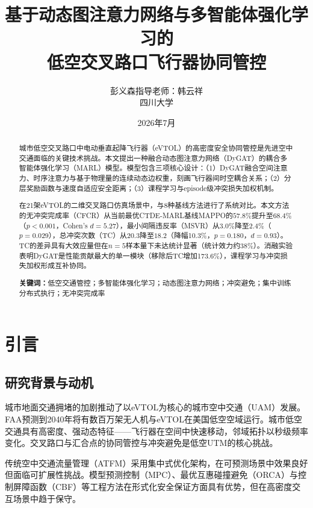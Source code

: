 \documentclass[12pt,a4paper,UTF8]{ctexart}
\title{\textbf{基于动态图注意力网络与多智能体强化学习的\\低空交叉路口飞行器协同管控}}
\author{彭义森\quad 指导老师：韩云祥\\[4pt]\small 四川大学}
\date{2026年7月}
\begin{document}
\maketitle

\begin{abstract}
城市低空交叉路口中电动垂直起降飞行器（eVTOL）的高密度安全协同管控是先进空中交通面临的关键技术挑战。本文提出一种融合动态图注意力网络（DyGAT）的耦合多智能体强化学习（MARL）模型。模型包含三项核心设计：（1）DyGAT融合空间注意力、时序注意力与基于物理量的连续动态边权重，刻画飞行器间时空耦合关系；（2）分层奖励函数与速度自适应安全距离；（3）课程学习与episode级冲突损失加权机制。

在21架eVTOL的二维交叉路口仿真场景中，与8种基线方法进行了系统对比。本文方法的无冲突完成率（CFCR）从当前最优CTDE-MARL基线MAPPO的$57.8\%$提升至$68.4\%$（$p<0.001$，Cohen's $d=5.27$），最小间隔违反率（MSVR）从$3.0\%$降至$2.4\%$（$p=0.029$），总冲突次数（TC）从$20.3$降至$18.2$（降幅10.3\%，$p=0.180$，$d=0.93$）。TC的差异具有大效应量但在$n=5$样本量下未达统计显著（统计效力约38\%）。消融实验表明DyGAT是性能贡献最大的单一模块（移除后TC增加173.6\%），课程学习与冲突损失加权形成互补协同。

\noindent\textbf{关键词：}低空交通管控；多智能体强化学习；动态图注意力网络；冲突避免；集中训练分布式执行；无冲突完成率
\end{abstract}

\section{引言}

\subsection{研究背景与动机}

城市地面交通拥堵的加剧推动了以eVTOL为核心的城市空中交通（UAM）发展。FAA预测到2040年将有数百万架无人机与eVTOL在美国低空空域运行\cite{ref1}。城市低空交通具有高密度、强动态特征——飞行器在空间中快速移动，邻域拓扑以秒级频率变化。交叉路口与汇合点的协同管控与冲突避免是低空UTM的核心挑战。

传统空中交通流量管理（ATFM）采用集中式优化架构\cite{ref2}，在可预测场景中效果良好但面临可扩展性挑战。模型预测控制（MPC）\cite{ref3}、最优互惠碰撞避免（ORCA）\cite{ref4}与控制屏障函数（CBF）\cite{ref5}等工程方法在形式化安全保证方面具有优势，但在高密度交互场景中趋于保守。
\end{document}

